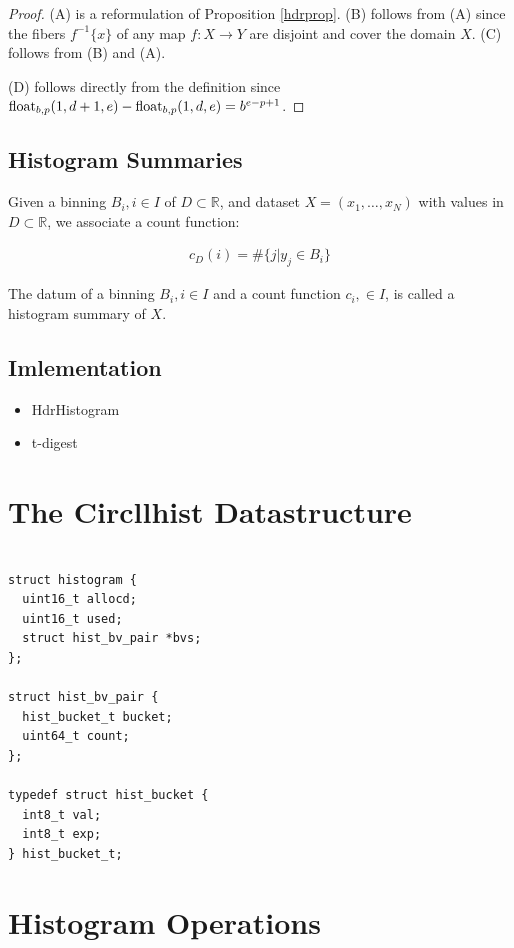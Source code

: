 \documentclass{article}
\theoremstyle{plain}
\theoremstyle{remark}
\newcommand{\IR}{\mathbb{R}}
\begin{document}
\begin{proof}
  (A) is a reformulation of Proposition \ref{hdrprop}.
  (B) follows from (A) since the fibers $f^{-1}\{x\}$ of any map $f:X \rightarrow Y$ are disjoint and cover the domain $X$.
  (C) follows from (B) and (A).

  (D) follows directly from the definition since $\mathrm{float}_{b,p}(1,d+1,e)-\mathrm{float}_{b,p}(1,d,e) = b^{e-p+1}$.
\end{proof}

\subsection{Histogram Summaries}
Given a binning $B_i, i\in I$ of $D \subset \IR$, and  dataset $X=(x_1,\dots, x_N) $ with values in
$D \subset \IR$, we associate a count function:

\begin{align*} c_D(i) = \# \{ j | y_j \in B_i \} \end{align*}

The datum of a binning $B_i,i\in I$ and a count function $c_i,\in I$, is called a histogram summary of $X$.

\subsection{Imlementation}

\begin{itemize}
\item HdrHistogram
\item t-digest
\end{itemize}

\section{The Circllhist Datastructure}
\begin{verbatim}

struct histogram {
  uint16_t allocd;
  uint16_t used;
  struct hist_bv_pair *bvs;
};

struct hist_bv_pair {
  hist_bucket_t bucket;
  uint64_t count;
};

typedef struct hist_bucket {
  int8_t val;
  int8_t exp;
} hist_bucket_t;
\end{verbatim}

\section{Histogram Operations}
\end{document}

